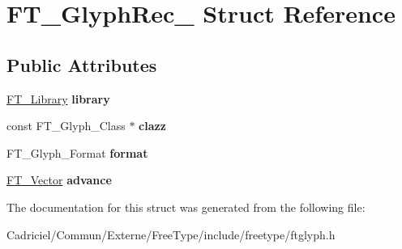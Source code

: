 \hypertarget{struct_f_t___glyph_rec__}{}\section{F\+T\+\_\+\+Glyph\+Rec\+\_\+ Struct Reference}
\label{struct_f_t___glyph_rec__}
\subsection*{Public Attributes}
\begin{DoxyCompactItemize}
\item 
\hyperlink{struct_f_t___library_rec__}{F\+T\+\_\+\+Library} {\bfseries library}\hypertarget{struct_f_t___glyph_rec___a00679b5e2519affab0f3999718817f8e}{}\label{struct_f_t___glyph_rec___a00679b5e2519affab0f3999718817f8e}

\item 
const F\+T\+\_\+\+Glyph\+\_\+\+Class $\ast$ {\bfseries clazz}\hypertarget{struct_f_t___glyph_rec___ad7074cfe0e9fd6616e4dc4011e481524}{}\label{struct_f_t___glyph_rec___ad7074cfe0e9fd6616e4dc4011e481524}

\item 
F\+T\+\_\+\+Glyph\+\_\+\+Format {\bfseries format}\hypertarget{struct_f_t___glyph_rec___a26b42a2610a69dcaed3e7c8b6d506211}{}\label{struct_f_t___glyph_rec___a26b42a2610a69dcaed3e7c8b6d506211}

\item 
\hyperlink{struct_f_t___vector__}{F\+T\+\_\+\+Vector} {\bfseries advance}\hypertarget{struct_f_t___glyph_rec___afd95b047df6a249db79018a279137018}{}\label{struct_f_t___glyph_rec___afd95b047df6a249db79018a279137018}

\end{DoxyCompactItemize}


The documentation for this struct was generated from the following file\+:\begin{DoxyCompactItemize}
\item 
Cadriciel/\+Commun/\+Externe/\+Free\+Type/include/freetype/ftglyph.\+h\end{DoxyCompactItemize}
